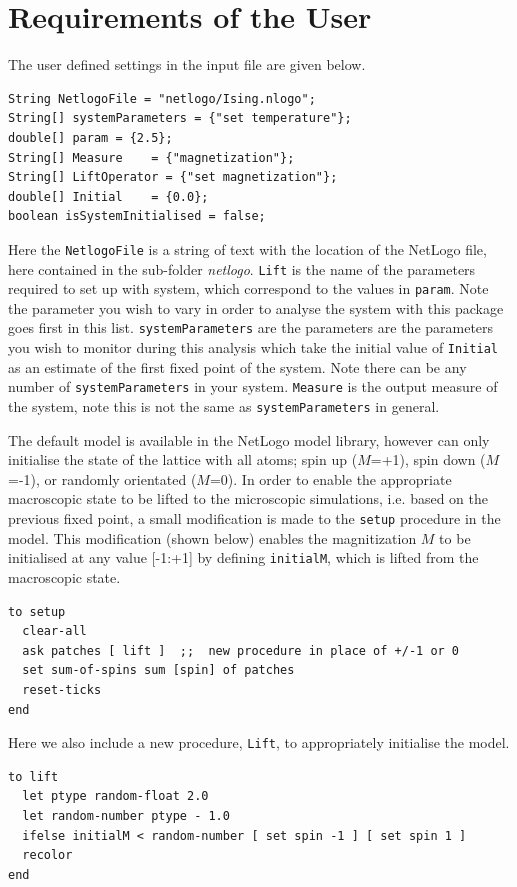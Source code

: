 \documentclass[11pt]{article}
\begin{document}
\section{Requirements of the User}
The user defined settings in the input file are given below. 
\begin{lstlisting}
String NetlogoFile = "netlogo/Ising.nlogo"; 
String[] systemParameters = {"set temperature"};
double[] param = {2.5}; 
String[] Measure	= {"magnetization"}; 
String[] LiftOperator = {"set magnetization"}; 
double[] Initial	= {0.0}; 
boolean isSystemInitialised = false; 
\end{lstlisting}		
	Here the {\tt NetlogoFile} is a string of text with the location of the NetLogo file, here contained in the sub-folder {\it netlogo}. {\tt Lift} is the name of the parameters required to set up with system, which correspond to the values in {\tt param}. Note the parameter you wish to vary in order to analyse the system with this package goes first in this list. {\tt systemParameters} are the parameters are the parameters you wish to monitor during this analysis which take the initial value of {\tt Initial} as an estimate of the first fixed point of the system. Note there can be any number of {\tt systemParameters} in your system. {\tt Measure} is the output measure of the system, note this is not the same as {\tt systemParameters} in general. 


The default model is available in the NetLogo model library, however can only initialise the state of the lattice with all atoms; spin up ($M$=+1), spin down ($M$=-1), or randomly orientated ($M$=0). In order to enable the appropriate macroscopic state to be lifted to the microscopic simulations, i.e. based on the previous fixed point, a small modification is made to the {\tt setup} procedure in the model. This modification (shown below) enables the magnitization $M$ to be initialised at any value [-1:+1] by defining {\tt initialM}, which is lifted from the macroscopic state.
\newpage
\begin{lstlisting}
to setup
  clear-all 
  ask patches [ lift ]	;;  new procedure in place of +/-1 or 0
  set sum-of-spins sum [spin] of patches
  reset-ticks
end
\end{lstlisting}	
Here we also include a new procedure, {\tt Lift}, to appropriately initialise the model.
\begin{lstlisting}
to lift 
  let ptype random-float 2.0
  let random-number ptype - 1.0 
  ifelse initialM < random-number [ set spin -1 ] [ set spin 1 ]
  recolor
end
\end{lstlisting}
\end{document}
